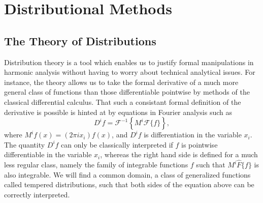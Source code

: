 
\part{Distributional Methods}

\chapter{The Theory of Distributions}

Distribution theory is a tool which enables us to justify formal manipulations in harmonic analysis without having to worry about technical analytical issues. For instance, the theory allows us to take the formal derivative of a much more general class of functions than those differentiable pointwise by methods of the classical differential calculus. That such a consistant formal definition of the derivative is possible is hinted at by equations in Fourier analysis such as
%
\[ D^i f = \mathcal{F}^{-1} \left\{ M^i \mathcal{F} \{ f \} \right\}, \]
%
where $M^i f(x) = (2 \pi i x_i) f(x)$, and $D^i f$ is differentiation in the variable $x_i$. The quantity $D^i f$ can only be classically interpreted if $f$ is pointwise differentiable in the variable $x_i$, whereas the right hand side is defined for a much less regular class, namely the family of integrable functions $f$ such that $M^i \widehat{F} \{ f \}$ is also integrable. We will find a common domain, a class of generalized functions called tempered distributions, such that both sides of the equation above can be correctly interpreted.

